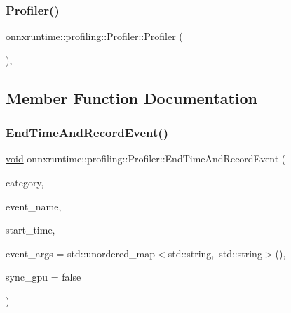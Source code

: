 \subsubsection{\texorpdfstring{Profiler()}{Profiler()}}
{\footnotesize\ttfamily onnxruntime\+::profiling\+::\+Profiler\+::\+Profiler (\begin{DoxyParamCaption}{ }\end{DoxyParamCaption})\hspace{0.3cm}{\ttfamily [inline]}, {\ttfamily [noexcept]}}



\subsection{Member Function Documentation}
\mbox{\label{classonnxruntime_1_1profiling_1_1Profiler_a4dc59c0289a90e418afdca6aba5e3488}} 
\subsubsection{\texorpdfstring{End\+Time\+And\+Record\+Event()}{EndTimeAndRecordEvent()}}
{\footnotesize\ttfamily \mbox{\hyperlink{mlasi_8h_a88f941d423cb2a819b70a1358982b1a6}{void}} onnxruntime\+::profiling\+::\+Profiler\+::\+End\+Time\+And\+Record\+Event (\begin{DoxyParamCaption}\item[{\mbox{\hyperlink{namespaceonnxruntime_1_1profiling_acbb1d7474c26b32c5bfef2ce1ab63734}{Event\+Category}}}]{category,  }\item[{const std\+::string \&}]{event\+\_\+name,  }\item[{\mbox{\hyperlink{namespaceonnxruntime_a9b5a17a572f7c3cf77f4892542bd7153}{Time\+Point}} \&}]{start\+\_\+time,  }\item[{std\+::unordered\+\_\+map$<$ std\+::string, std\+::string $>$ \&\&}]{event\+\_\+args = {\ttfamily std\+:\+:unordered\+\_\+map$<$std\+:\+:string,~std\+:\+:string$>$()},  }\item[{bool}]{sync\+\_\+gpu = {\ttfamily false} }\end{DoxyParamCaption})}

\mbox{\label{classonnxruntime_1_1profiling_1_1Profiler_a3629a36c6c2d6ae848f7683999f64f35}} 
